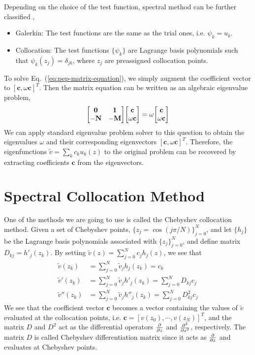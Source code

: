 Depending on the choice of the test function, spectral method can be further classified \cite{shen_tang_etal_spectral_2011},
\begin{itemize}
	\item Galerkin: The test functions are the same as the trial ones, i.e. $\psi_k=u_k$.
	\item Collocation:  The test functions $\{\psi_k\}$ are Lagrange basis polynomials such that $\psi_k(z_j)=\delta_{jk}$, where ${z_j}$ are preassigned collocation points.
\end{itemize}

To solve Eq.~(\ref{eq:pep-matrix-equation}), we simply augment the coefficient vector to $[\mathbf{c}, \omega\mathbf{c}]^T$. Then the matrix equation can be written as an algebraic eigenvalue problem,
\begin{equation} \label{eq:eigenvalue-problem}
	\mqty[ \mathbf{0} & \mathbf{1}\\ -\mathbf{N} & -\mathbf{M} ]\mqty[ \mathbf{c}\\ \omega\mathbf{c}] = \omega\mqty[ \mathbf{c}\\ \omega\mathbf{c}]
\end{equation}
We can apply standard eigenvalue problem solver to this question to obtain the eigenvalues $\omega$ and their corresponding eigenvectors $[\mathbf{c}, \omega\mathbf{c}]^T$. Therefore, the eigenfunctions $\tilde{v} = \sum_k c_ku_k(z)$ to the original problem can be recovered by extracting coefficients $\mathbf{c}$ from the eigenvectors.

\section{Spectral Collocation Method}
One of the methods we are going to use is called the Chebyshev collocation method.
Given a set of Chebyshev points, $\{z_j=\cos(j\pi/N)\}_{j=0}^{N}$, and let $\{h_j\}$ be the Lagrange basis polynomials associated with $\{z_j\}_{j=0}^{N}$, and define matrix $D_{kj} = h'_j(z_k)$. By setting $\tilde{v}(z) = \sum_{j=0}^{N}c_jh_j(z)$, we see that
\begin{align}
	\tilde{v}(z_k)   & = \sum_{j=0}^{N}\tilde{v}_jh_j(z_k) = c_k                         \\
	\tilde{v}'(z_k)  & = \sum_{j=0}^{N}\tilde{v}_jh'_j(z_k) = \sum_{j=0}^{N}D_{kj}c_j    \\
	\tilde{v}''(z_k) & = \sum_{j=0}^{N}\tilde{v}_jh''_j(z_k) = \sum_{j=0}^{N}D^2_{kj}c_j
\end{align}
We see that the coefficient vector $\mathbf{c}$ becomes a vector containing the values of $\tilde{v}$ evaluated at the collocation points, i.e. $\mathbf{c}=[v(z_0), \cdots, v(z_N)]^T$, and the matrix $D$ and $D^2$ act as the differential operators $\pdv{z}$ and $\pdv[2]{z}$, respectively. The matrix $D$ is called Chebyshev differentiation matrix since it acts as $\pdv{z}$ and evaluates at Chebyshev points.

